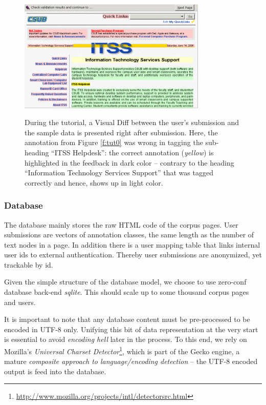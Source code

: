 \begin{figure}
	{\includegraphics[width=0.8\textwidth]{tut1}}
\caption{\label{f:tut1}During the tutorial, a Visual Diff between the user's submission and the sample data is presented right after submission.
	Here, the annotation from Figure \ref{f:tut0} was wrong in tagging the sub-heading ``ITSS Helpdesk'': the correct annotation (\textit{yellow}) is highlighted in the feedback in dark color -- contrary to the heading ``Information Technology Services Support'' that was tagged correctly and hence, shows up in light color.}
\end{figure}

\subsubsection{Database}

The database mainly stores the raw HTML code of the corpus pages.
User submissions are vectors of annotation classes, the same length as the number of text nodes in a page.
In addition there is a user mapping table that links internal user ids to external authentication.
Thereby user submissions are anonymized, yet trackable by id.

Given the simple structure of the database model, we choose to use zero-conf database back-end \textit{sqlite}.
This should scale up to some thousand corpus pages and users.

It is important to note that any database content must be pre-processed to be encoded in UTF-8 only.
Unifying this bit of data representation at the very start is essential to avoid \textit{encoding hell} later in the process.
To this end, we rely on Mozilla's \emph{Universal Charset Detector}\footnote{\url{http://www.mozilla.org/projects/intl/detectorsrc.html}},
which is part of the Gecko engine, a mature \emph{composite approach to language/encoding detection} \cite{LiMomoi2001} 
-- the UTF-8 encoded output is feed into the database.
